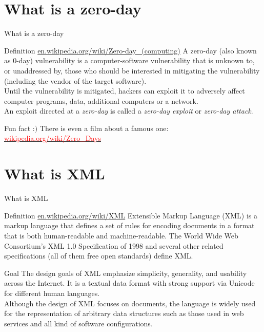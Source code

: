 \documentclass{beamer}
\begin{document}
\section{What is a zero-day}
\begin{frame}{What is a zero-day}\small
    \begin{block}{Definition \href{https://en.wikipedia.org/wiki/Zero-day\_(computing)}{en.wikipedia.org/wiki/Zero-day\_(computing)}}
          A zero-day (also known as 0-day) vulnerability is a computer-software vulnerability that is unknown to, or unaddressed by, those who should be interested in mitigating the vulnerability (including the vendor of the target software).\\\vspace{2mm}
          Until the vulnerability is mitigated, hackers can exploit it to adversely affect computer programs, data, additional computers or a network.\\\vspace{2mm}
          An exploit directed at a \emph{zero-day} is called a \emph{zero-day exploit} or \emph{zero-day attack}.
    \end{block}
    \vfill
    \begin{exampleblock}{Fun fact :$)$}
        There is even a film about a famous one: \href{https://en.wikipedia.org/wiki/Zero\_Days}{\textcolor{red}{wikipedia.org/wiki/Zero\_Days}}
    \end{exampleblock}
\end{frame}

\section{What is XML}
\begin{frame}{What is XML}
    \begin{block}{Definition \small\href{https://en.wikipedia.org/wiki/XML}{en.wikipedia.org/wiki/XML}}
          Extensible Markup Language (XML) is a markup language that defines a set of rules for encoding documents in a format that is both human-readable and machine-readable. The World Wide Web Consortium's XML 1.0 Specification of 1998 and several other related specifications (all of them free open standards) define XML.
    \end{block}
    \begin{block}{Goal}
    The design goals of XML emphasize simplicity, generality, and usability across the Internet. It is a textual data format with strong support via Unicode for different human languages.\\ Although the design of XML focuses on documents, the language is widely used for the representation of arbitrary data structures such as those used in web services and all kind of software configurations.
    \end{block}
\end{frame}
\end{document}
